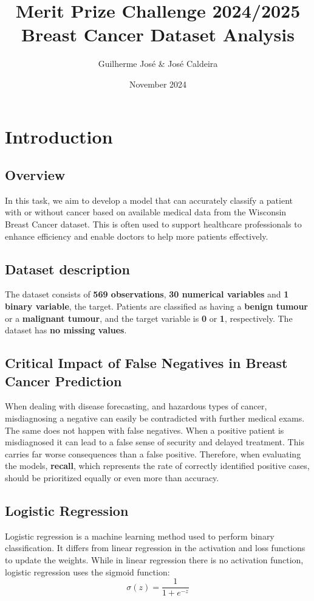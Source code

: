 \documentclass[a4paper,12pt]{article}
\title{Merit Prize Challenge 2024/2025 \\ \vspace{0.5cm} \large Breast Cancer Dataset Analysis}
\author{Guilherme José & José Caldeira}
\date{November 2024}
\begin{document}
\maketitle

\section{Introduction}
\label{sec:introduction}

\subsection{Overview}
In this task, we aim to develop a model that can accurately classify a patient with or without cancer based on available medical data from the Wisconsin Breast Cancer dataset. This is often used to support healthcare professionals to enhance efficiency and enable doctors to help more patients effectively.
\subsection{Dataset description}
The dataset consists of \textbf{569 observations}, \textbf{30 numerical variables} and \textbf{1 binary variable}, the target. Patients are classified as having a \textbf{benign tumour} or a \textbf{malignant tumour}, and the target variable is \textbf{0} or \textbf{1}, respectively. The dataset has \textbf{no missing values}.
\subsection{Critical Impact of False Negatives in Breast Cancer Prediction}
\label{subsec:false-negatives}
When dealing with disease forecasting, and hazardous types of cancer, misdiagnosing a negative can easily be contradicted with further medical exams. The same does not happen with false negatives. When a positive patient is misdiagnosed it can lead to a false sense of security and delayed treatment. This carries far worse consequences than a false positive. Therefore, when evaluating the models, \textbf{recall}, which represents the rate of correctly identified positive cases, should be prioritized equally or even more than accuracy.
\subsection{Logistic Regression}
Logistic regression is a machine learning method used to perform binary classification. It differs from linear regression in the activation and loss functions to update the weights. While in linear regression there is no activation function, logistic regression uses the sigmoid function:
\[ \sigma(z) = \frac{1}{1 + e^{-z}} \]
\end{document}
